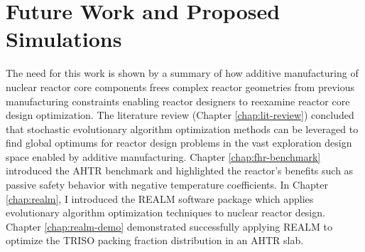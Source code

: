 \chapter{Future Work and Proposed Simulations}




The need for this work is shown by a summary of how additive manufacturing 
of nuclear reactor core components frees complex reactor geometries from 
previous manufacturing constraints enabling reactor designers to reexamine 
reactor core design optimization.
The literature review (Chapter \ref{chap:lit-review}) concluded that stochastic 
evolutionary algorithm optimization methods can be leveraged to find global 
optimums for reactor design problems in the vast exploration design space 
enabled by additive manufacturing. 
Chapter \ref{chap:fhr-benchmark} introduced the \acrfull{AHTR} benchmark and 
highlighted the reactor's benefits such as passive safety behavior with negative 
temperature coefficients. 
In Chapter \ref{chap:realm}, I introduced the \acrfull{REALM} software package 
which applies evolutionary algorithm optimization techniques to nuclear 
reactor design. 
Chapter \ref{chap:realm-demo} demonstrated successfully applying \gls{REALM} 
to optimize the \gls{TRISO} packing fraction distribution in an \gls{AHTR} slab. 

